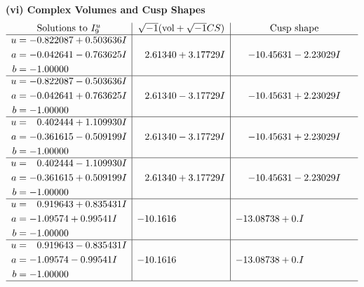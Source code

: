 \documentclass[1p]{elsarticle_modified}
\theoremstyle{definition}
\newcommand{\I}{\sqrt{-1}}
\begin{document}
\newpage\flushleft \textbf{(vi) Complex Volumes and Cusp Shapes}
$$\begin{array}{c|c|c}  
\text{Solutions to }I^u_{9}& \I (\text{vol} + \sqrt{-1}CS) & \text{Cusp shape}\\
 \hline 
\begin{aligned}
u &= -0.822087 + 0.503636 I \\
a &= -0.042641 - 0.763625 I \\
b &= -1.00000\phantom{ +0.000000I}\end{aligned}
 & \phantom{-}2.61340 + 3.17729 I & -10.45631 - 2.23029 I \\ \hline\begin{aligned}
u &= -0.822087 - 0.503636 I \\
a &= -0.042641 + 0.763625 I \\
b &= -1.00000\phantom{ +0.000000I}\end{aligned}
 & \phantom{-}2.61340 - 3.17729 I & -10.45631 + 2.23029 I \\ \hline\begin{aligned}
u &= \phantom{-}0.402444 + 1.109930 I \\
a &= -0.361615 - 0.509199 I \\
b &= -1.00000\phantom{ +0.000000I}\end{aligned}
 & \phantom{-}2.61340 - 3.17729 I & -10.45631 + 2.23029 I \\ \hline\begin{aligned}
u &= \phantom{-}0.402444 - 1.109930 I \\
a &= -0.361615 + 0.509199 I \\
b &= -1.00000\phantom{ +0.000000I}\end{aligned}
 & \phantom{-}2.61340 + 3.17729 I & -10.45631 - 2.23029 I \\ \hline\begin{aligned}
u &= \phantom{-}0.919643 + 0.835431 I \\
a &= -1.09574 + 0.99541 I \\
b &= -1.00000\phantom{ +0.000000I}\end{aligned}
 & -10.1616\phantom{ +0.000000I} & -13.08738 + 0. I\phantom{ +0.000000I} \\ \hline\begin{aligned}
u &= \phantom{-}0.919643 - 0.835431 I \\
a &= -1.09574 - 0.99541 I \\
b &= -1.00000\phantom{ +0.000000I}\end{aligned}
 & -10.1616\phantom{ +0.000000I} & -13.08738 + 0. I\phantom{ +0.000000I}\\
 \hline 
 \end{array}$$\newpage\newpage\renewcommand{\arraystretch}{1}
\end{document}
